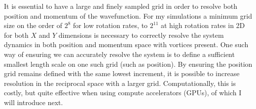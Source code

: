 It is essential to have a large and finely sampled grid in order to resolve both position and momentum of the wavefunction. For my simulations a minimum grid size on the order of $2^8$ for low rotation rates, to $2^{11}$ at high rotation rates in 2D for both $X$ and $Y$ dimensions is necessary to correctly resolve the system dynamics in both position and momentum space with vortices present. One such way of ensuring we can accurately resolve the system is to define a sufficient smallest length scale on one such grid (such as position). By ensuring the position grid remains defined with the same lowest increment, it is possible to increase resolution in the reciprocal space with a larger grid. Computationally, this is costly, but quite effective when using compute accelerators (GPUs), of which I will introduce next. %
